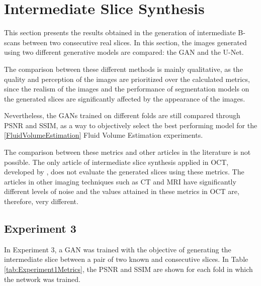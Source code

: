 \section{Intermediate Slice Synthesis}\label{IntermediateSliceSynthesis}

This section presents the results obtained in the generation of intermediate B-scans between two consecutive real slices. In this section, the images generated using two different generative models are compared: the GAN and the U-Net.
\par
The comparison between these different methods is mainly qualitative, as the quality and perception of the images are prioritized over the calculated metrics, since the realism of the images and the performance of segmentation models on the generated slices are significantly affected by the appearance of the images.
\par
Nevertheless, the GANs trained on different folds are still compared through PSNR and SSIM, as a way to objectively select the best performing model for the \ref{FluidVolumeEstimation} Fluid Volume Estimation experiments.
\par
The comparison between these metrics and other articles in the literature is not possible. The only article of intermediate slice synthesis applied in OCT, developed by \textcite{Lopez2023}, does not evaluate the generated slices using these metrics. The articles in other imaging techniques such as CT and MRI have significantly different levels of noise and the values attained in these metrics in OCT are, therefore, very different.

\subsection{Experiment 3}

In Experiment 3, a GAN was trained with the objective of generating the intermediate slice between a pair of two known and consecutive slices. In Table \ref{tab:Experiment1Metrics}, the PSNR and SSIM are shown for each fold in which the network was trained.

